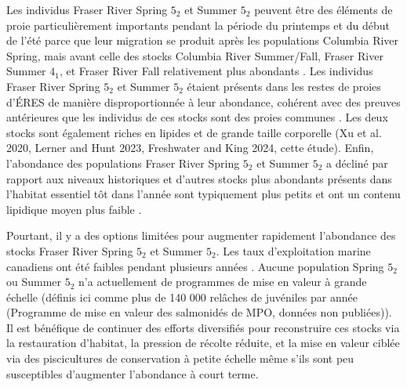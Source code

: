 Les individus Fraser River Spring $5_2$ et Summer $5_2$ peuvent être des éléments de proie particulièrement importants pendant la période du printemps et du début de l'été parce que leur migration se produit après les populations Columbia River Spring, mais avant celle des stocks Columbia River Summer/Fall, Fraser River Summer $4_1$, et Fraser River Fall relativement plus abondants \citep{keeferStockspecificMigrationTiming2004, parkenGeneticCodedWire2008, jepsonPopulationCompositionMigration2010}. Les individus Fraser River Spring $5_2$ et Summer $5_2$ étaient présents dans les restes de proies d'ÉRES de manière disproportionnée à leur abondance, cohérent avec des preuves antérieures que les individus de ces stocks sont des proies communes \citep{hansonSpeciesStockIdentification2010}. Les deux stocks sont également riches en lipides et de grande taille corporelle (Xu et al. 2020, Lerner and Hunt 2023, Freshwater and King 2024, cette étude). Enfin, l'abondance des populations Fraser River Spring $5_2$ et Summer $5_2$ a décliné par rapport aux niveaux historiques \citep{cosewicChinookSalmonOncorhynchus2018, dfoRecoveryPotentialAssessment2020a, dfoRecoveryPotentialAssessment2021} et d'autres stocks plus abondants présents dans l'habitat essentiel tôt dans l'année sont typiquement plus petits et ont un contenu lipidique moyen plus faible \citep{oneillEnergyContentPacific2014, freshwaterIntegratedModelSeasonal2021, hendriksBehaviourMovementReturn2024, freshwaterSeasonalVariabilityCondition2024}.

Pourtant, il y a des options limitées pour augmenter rapidement l'abondance des stocks Fraser River Spring $5_2$ et Summer $5_2$. Les taux d'exploitation marine canadiens ont été faibles pendant plusieurs années \citep{dfoFraserChinookFishery2023}. Aucune population Spring $5_2$ ou Summer $5_2$ n'a actuellement de programmes de mise en valeur à grande échelle (définis ici comme plus de 140 000 relâches de juvéniles par année (Programme de mise en valeur des salmonidés de MPO, données non publiées)). Il est bénéfique de continuer des efforts diversifiés pour reconstruire ces stocks via la restauration d'habitat, la pression de récolte réduite, et la mise en valeur ciblée via des piscicultures de conservation à petite échelle même s'ils sont peu susceptibles d'augmenter l'abondance à court terme.

